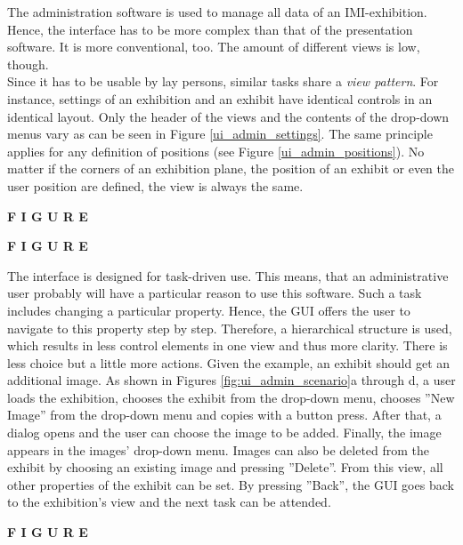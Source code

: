 The administration software is used to manage all data of an \ac{IMI}-exhibition. Hence, the interface has to be more complex than that of the presentation software. It is more conventional, too. The amount of different views is low, though. 
\\
Since it has to be usable by lay persons, similar tasks share a \textit{view pattern}. For instance, settings of an exhibition and an exhibit have identical controls in an identical layout. Only the header of the views and the contents of the drop-down menus vary as can be seen in Figure \ref{ui_admin_settings}. The same principle applies for any definition of positions (see Figure \ref{ui_admin_positions}). No matter if the corners of an exhibition plane, the position of an exhibit or even the user position are defined, the view is always the same.

\textbf{F I G U R E}

\textbf{F I G U R E}

The interface is designed for task-driven use. This means, that an administrative user probably will have a particular reason to use this software. Such a task includes changing a particular property. Hence, the \ac{GUI} offers the user to navigate to this property step by step. Therefore, a hierarchical structure is used, which results in less control elements in one view and thus more clarity. There is less choice but a little more actions. Given the example, an exhibit should get an additional image. As shown in Figures \ref{fig:ui_admin_scenario}a through d, a user loads the exhibition, chooses the exhibit from the drop-down menu, chooses ''New Image'' from the drop-down menu and copies with a button press. After that, a dialog opens and the user can choose the image to be added. Finally, the image appears in the images' drop-down menu. Images can also be deleted from the exhibit by choosing an existing image and pressing ''Delete''. From this view, all other properties of the exhibit can be set. By pressing ''Back'', the \ac{GUI} goes back to the exhibition's view and the next task can be attended.

\textbf{F I G U R E}

